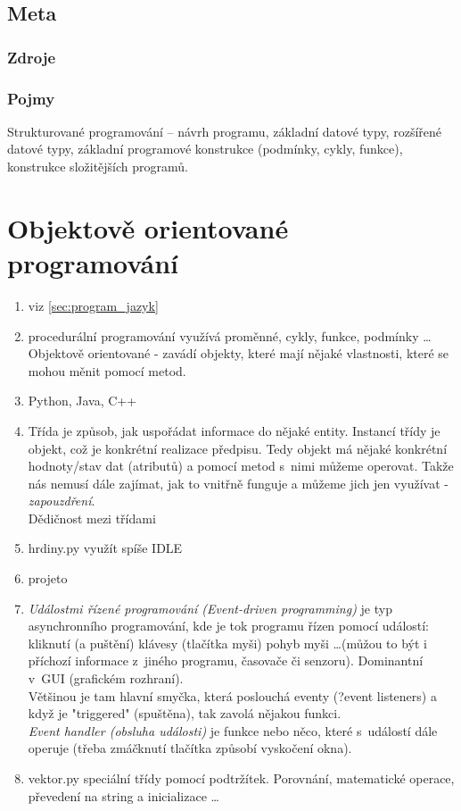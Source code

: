 \documentclass[12pt]{article}
\begin{document}
\subsection{Meta}
\subsubsection{Zdroje}
\subsubsection{Pojmy}
Strukturované programování – návrh programu, základní datové typy, rozšířené datové typy, základní programové konstrukce (podmínky, cykly, funkce), konstrukce složitějších programů.

\section{Objektově orientované programování}
\begin{enumerate}
\item viz \ref{sec:program_jazyk}
\item procedurální programování využívá proměnné, cykly, funkce, podmínky \dots \\
Objektově orientované - zavádí objekty, které mají nějaké vlastnosti, které se mohou měnit pomocí metod.
\item Python, Java, C++
\item Třída je způsob, jak uspořádat informace do nějaké entity. Instancí třídy je objekt, což je konkrétní realizace předpisu. Tedy objekt má nějaké konkrétní hodnoty/stav dat (atributů) a pomocí metod s~nimi můžeme operovat. Takže nás nemusí dále zajímat, jak to vnitřně funguje a můžeme jich jen využívat - \emph{zapouzdření}.\\
Dědičnost mezi třídami
\item hrdiny.py využít spíše IDLE
\item projeto
\item \emph{Událostmi řízené programování (Event-driven programming)} je typ asynchronního programování, kde je tok programu řízen pomocí událostí: kliknutí (a puštění) klávesy (tlačítka myši) pohyb myši \dots (můžou to být i příchozí informace z~jiného programu, časovače či senzoru). Dominantní v~GUI (grafickém rozhraní).\\
Většinou je tam hlavní smyčka, která poslouchá eventy (?event listeners) a když je "triggered" (spuštěna), tak zavolá nějakou funkci.\\
\emph{Event handler (obsluha události)} je funkce nebo něco, které s~událostí dále operuje (třeba zmáčknutí tlačítka způsobí vyskočení okna).
\item vektor.py speciální třídy pomocí podtržítek. Porovnání, matematické operace, převedení na string a inicializace \dots
\end{enumerate}
\end{document}
